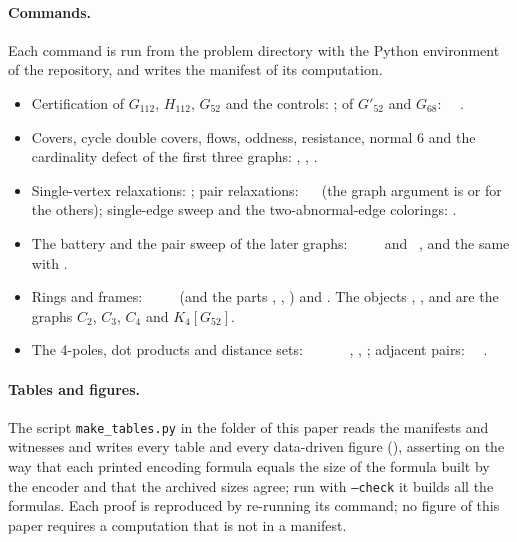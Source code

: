 \documentclass[11pt]{article}
\theoremstyle{definition}
\theoremstyle{remark}
\newcommand{\Gmain}{G_{112}}
\newcommand{\Gsym}{H_{112}}
\newcommand{\Gfty}{G_{52}}
\newcommand{\Gftyb}{G'_{52}}
\newcommand{\Gsix}{G_{68}}
\begin{document}
\paragraph{Commands.} Each command is run from the problem directory with the Python environment of
the repository, and writes the manifest of its computation.
\begin{itemize}\raggedright\setlength{\itemsep}{1pt}
\item Certification of $\Gmain$, $\Gsym$, $\Gfty$ and the controls: ; of $\Gftyb$ and $\Gsix$: \ \ .
\item Covers, cycle double covers, flows, oddness, resistance, normal 6 and the cardinality defect of the first three graphs: , , .
\item Single-vertex relaxations: ; pair relaxations: \ \  (the graph argument is  or  for the others); single-edge sweep and the two-abnormal-edge colorings: .
\item The battery and the pair sweep of the later graphs: \ \ \ \  and \ , and the same with .
\item Rings and frames: \ \ \ \  (and the parts , , ) and . The objects , ,  and  are the graphs $C_2$, $C_3$, $C_4$ and $K_4[\Gfty]$.
\item The 4-poles, dot products and distance sets: \ \ \ \ \ \ , , ; adjacent pairs: \ \ .
\end{itemize}

\paragraph{Tables and figures.} The script \texttt{make\_tables.py} in the folder of this
paper reads the manifests and witnesses and writes every table and every data-driven figure
(), asserting on the way that each printed encoding formula equals the size of the
formula built by the encoder and that the archived sizes agree; run with \texttt{--check} it builds all
the formulas. Each proof is reproduced by re-running its command; no figure of this paper requires a
computation that is not in a manifest.
\par
\end{document}
